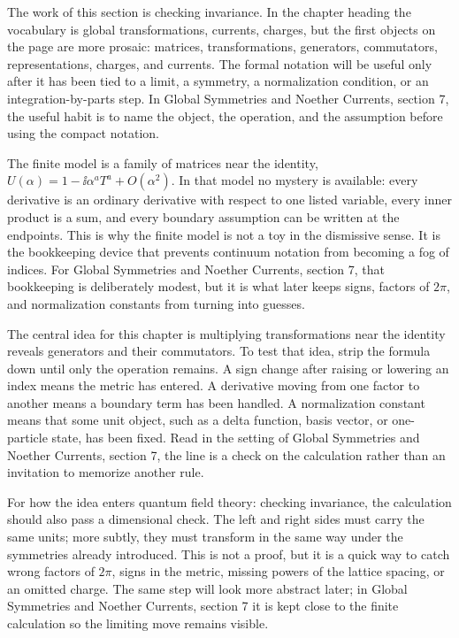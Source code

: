 The work of this section is checking invariance.  In the chapter heading the vocabulary is global transformations, currents, charges, but the first objects on the page are more prosaic: matrices, transformations, generators, commutators, representations, charges, and currents.  The formal notation will be useful only after it has been tied to a limit, a symmetry, a normalization condition, or an integration-by-parts step.  In Global Symmetries and Noether Currents, section 7, the useful habit is to name the object, the operation, and the assumption before using the compact notation.

The finite model is a family of matrices near the identity, \(U(\alpha)=1-\ii\alpha^aT^a+O(\alpha^2)\).  In that model no mystery is available: every derivative is an ordinary derivative with respect to one listed variable, every inner product is a sum, and every boundary assumption can be written at the endpoints.  This is why the finite model is not a toy in the dismissive sense.  It is the bookkeeping device that prevents continuum notation from becoming a fog of indices.  For Global Symmetries and Noether Currents, section 7, that bookkeeping is deliberately modest, but it is what later keeps signs, factors of \(2\pi\), and normalization constants from turning into guesses.

The central idea for this chapter is multiplying transformations near the identity reveals generators and their commutators.  To test that idea, strip the formula down until only the operation remains.  A sign change after raising or lowering an index means the metric has entered.  A derivative moving from one factor to another means a boundary term has been handled.  A normalization constant means that some unit object, such as a delta function, basis vector, or one-particle state, has been fixed.  Read in the setting of Global Symmetries and Noether Currents, section 7, the line is a check on the calculation rather than an invitation to memorize another rule.

For how the idea enters quantum field theory: checking invariance, the calculation should also pass a dimensional check.  The left and right sides must carry the same units; more subtly, they must transform in the same way under the symmetries already introduced.  This is not a proof, but it is a quick way to catch wrong factors of \(2\pi\), signs in the metric, missing powers of the lattice spacing, or an omitted charge.  The same step will look more abstract later; in Global Symmetries and Noether Currents, section 7 it is kept close to the finite calculation so the limiting move remains visible.


